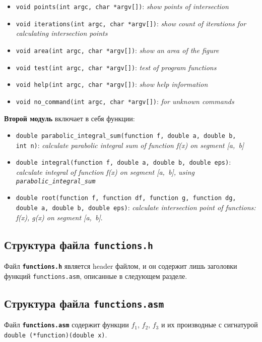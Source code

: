 \documentclass[a4paper,12pt,titlepage,finall]{article}
\begin{document}
\begin{itemize}
	\item \texttt{void points(int argc, char *argv[])}: \textit{show points of intersection}
	\item \texttt{void iterations(int argc, char *argv[])}: \textit{show count of iterations for calculating intersection points}
	\item \texttt{void area(int argc, char *argv[])}: \textit{show an area of the figure}
	\item \texttt{void test(int argc, char *argv[])}: \textit{test of program functions}
	\item \texttt{void help(int argc, char *argv[])}: \textit{show help information}
	\item \texttt{void no\_command(int argc, char *argv[])}: \textit{for unknown commands}
\end{itemize}
\textbf{Второй модуль} включает в себя функции:

\begin{itemize}
	\item \texttt{double parabolic\_integral\_sum(function f, double a, double b, int~n)}: \textit{calculate parabolic integral sum of function f(x) on segment [a,~b]}
	\item \texttt{double integral(function f, double a, double b, double eps)}: \textit{calculate integral of function f(x) on segment [a,~b], using \texttt{parabolic\_integral\_sum}}
	\item \texttt{double root(function f, function df, function g, function dg, double~a, double~b, double~eps)}: \textit{calculate intersection point of functions: f(x), g(x) on segment [a,~b]}.
\end{itemize}

\subsection{Структура файла \texttt{\textbf{functions.h}}}

Файл \texttt{\textbf{functions.h}} является header файлом, и он содержит лишь заголовки функций \texttt{functions.asm}, описанные в следующем разделе.

\subsection{Структура файла \texttt{\textbf{functions.asm}}}

Файл \texttt{\textbf{functions.asm}} содержит функции $f_1$, $f_2$, $f_3$ и их производные с сигнатурой \texttt{double (*function)(double x)}.
\end{document}
